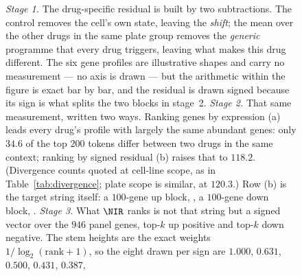 \begin{figure}[htbp]
\begin{fullwidth}
\caption[The residual, the target string and the scored vector]{
\emph{Stage 1.} The drug-specific residual is built by two subtractions. The
control removes the cell's own state, leaving the \emph{shift}; the mean over
the other drugs in the same plate group removes the \emph{generic} programme
that every drug triggers, leaving what makes this drug different. The six
gene profiles are illustrative shapes and carry no measurement --- no axis is
drawn --- but the arithmetic within the figure is exact bar by bar, and the
residual is drawn signed because its sign is what splits the two blocks in
stage~2. \emph{Stage 2.} That same measurement, written two ways. Ranking genes
by expression (a) leads every drug's profile with largely the same abundant
genes: only $34.6$ of the top $200$ tokens differ between two drugs in the same
context; ranking by signed residual
(b) raises that to $118.2$. (Divergence counts quoted at cell-line scope, as in
Table~\ref{tab:divergence}; plate scope is similar, at $120.3$.) Row (b) is the
target string itself: a $100$-gene up block, \DOWN, a $100$-gene down block,
\ENDCELL. \emph{Stage 3.} What $\NIR$ ranks is not that string but a signed
vector over the $946$ panel genes, top-$k$ up positive and top-$k$ down
negative. The stem heights are the exact weights $1/\log_2(\textrm{rank}+1)$, so
the eight drawn per sign are $1.000$, $0.631$, $0.500$, $0.431$, $0.387$,
}
\end{fullwidth}
\end{figure}
